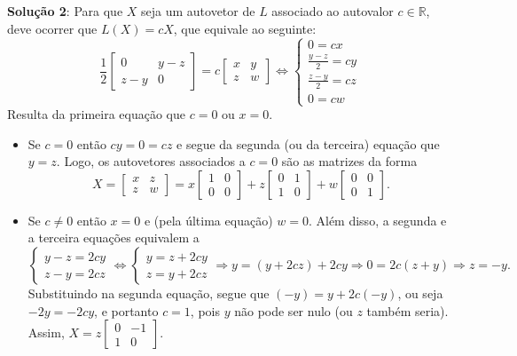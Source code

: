 \documentclass[12pt,a4paper]{article}
\newcommand*\R{\mathbb{R}}
\begin{document}
\begin{ExerciseList}
\begin{enumerate}
\textbf{Solução 2}: Para que $X$ seja um autovetor de $L$ associado ao autovalor $c \in \R$, deve ocorrer que $L(X) = cX$, que equivale ao seguinte:
\[
\frac{1}{2}
\begin{bmatrix}
0 & y-z \\
z-y & 0
\end{bmatrix}
=
c
\begin{bmatrix}
x & y \\
z & w
\end{bmatrix}
\Leftrightarrow
\begin{cases}
0 = cx \\
\frac{y-z}{2} = cy \\
\frac{z-y}{2} = cz \\
0 = cw
\end{cases}
\]
Resulta da primeira equação que $c = 0$ ou $x = 0$.
\begin{itemize}
\item Se $c = 0$ então $cy = 0 = cz$ e segue da segunda (ou da terceira) equação que $y=z$. Logo, os autovetores associados a $c = 0$ são as matrizes da forma
\[
X =
\begin{bmatrix}
x & z \\
z & w
\end{bmatrix}
=
x
\begin{bmatrix}
1 & 0 \\
0 & 0
\end{bmatrix}
+z
\begin{bmatrix}
0 & 1 \\
1 & 0
\end{bmatrix}
+w
\begin{bmatrix}
0 & 0 \\
0 & 1
\end{bmatrix}.
\]
\item Se $c \neq 0$ então $x = 0$ e (pela última equação) $w = 0$. Além disso, a segunda e a terceira equações equivalem a
\[
\begin{cases}
y-z = 2cy\\
z-y = 2cz
\end{cases}
\Leftrightarrow
\begin{cases}
y = z + 2cy\\
z = y + 2cz
\end{cases}
\Rightarrow
y = (y + 2cz) + 2cy
\Rightarrow
0 = 2c(z + y)
\Rightarrow
z=-y.
\]
Substituindo na segunda equação, segue que $(-y) = y + 2c(-y)$, ou seja $-2y=-2cy$, e portanto $c = 1$, pois $y$ não pode ser nulo (ou $z$ também seria). Assim, $X
= z
\begin{bmatrix}
0 & -1 \\
1 & 0
\end{bmatrix}$.


\end{itemize}
\end{enumerate}
\end{ExerciseList}
\end{document}

